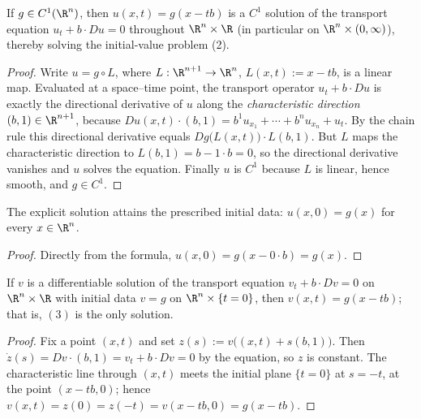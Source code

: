 \begin{theorem}
\label{thm:transport-ivp-solution}
\leanok
If $g \in C^1(\R^n)$, then $u(x,t) = g(x - tb)$ is a $C^1$ solution of the
transport equation $u_t + b \cdot Du = 0$ throughout $\R^n \times \R$ (in
particular on $\R^n \times (0,\infty)$), thereby solving the initial-value
problem (2).
\end{theorem}
\begin{proof}
\leanok
Write $u = g \circ L$, where $L : \R^{n+1} \to \R^n$, $L(x,t) := x - tb$, is a
linear map. Evaluated at a space--time point, the transport operator
$u_t + b \cdot Du$ is exactly the directional derivative of $u$ along the
\textit{characteristic direction} $(b,1) \in \R^{n+1}$, because
$Du(x,t) \cdot (b,1) = b^1 u_{x_1} + \cdots + b^n u_{x_n} + u_t$. By the chain
rule this directional derivative equals $Dg\bigl(L(x,t)\bigr) \cdot L(b,1)$.
But $L$ maps the characteristic direction to $L(b,1) = b - 1 \cdot b = 0$, so the
directional derivative vanishes and $u$ solves the equation. Finally $u$ is
$C^1$ because $L$ is linear, hence smooth, and $g \in C^1$.
\end{proof}

\begin{theorem}
\label{thm:transport-initial-condition}
\leanok
The explicit solution attains the prescribed initial data: $u(x,0) = g(x)$ for
every $x \in \R^n$.
\end{theorem}
\begin{proof}
\leanok
Directly from the formula, $u(x,0) = g(x - 0 \cdot b) = g(x)$.
\end{proof}

\begin{theorem}
\label{thm:transport-ivp-uniqueness}
\leanok
If $v$ is a differentiable solution of the transport equation
$v_t + b \cdot Dv = 0$ on $\R^n \times \R$ with initial data $v = g$ on
$\R^n \times \{t = 0\}$, then $v(x,t) = g(x - tb)$; that is, $(3)$ is the only
solution.
\end{theorem}
\begin{proof}
\leanok
Fix a point $(x,t)$ and set $z(s) := v\bigl((x,t) + s(b,1)\bigr)$. Then
$\dot z(s) = Dv \cdot (b,1) = v_t + b \cdot Dv = 0$ by the equation, so $z$ is
constant. The characteristic line through $(x,t)$ meets the initial plane
$\{t = 0\}$ at $s = -t$, at the point $(x - tb, 0)$; hence
$v(x,t) = z(0) = z(-t) = v(x - tb, 0) = g(x - tb)$.
\end{proof}


